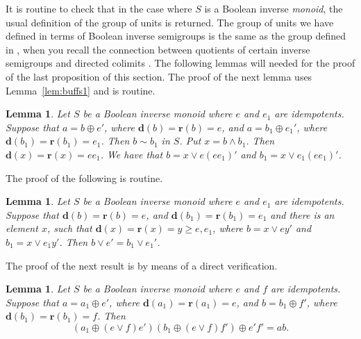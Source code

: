 \documentclass[a4paper]{amsart}
\newtheorem{lemma}[theorem]{Lemma}
\begin{document}
It is routine to check that in the case where $S$ is a Boolean inverse {\em monoid}, 
the usual definition of the group of units is returned.
The group of units we have defined in terms of Boolean inverse semigroups is the same
as the group defined in \cite[Remark 3.10]{NO}, 
when you recall the connection between quotients of certain inverse semigroups and directed colimits \cite[Section 2.5]{LS2}.
The following lemmas will needed for the proof of the last proposition of this section.
The proof of the next lemma uses Lemma~\ref{lem:buffs1} and is routine.

\begin{lemma}\label{lem:matt} Let $S$ be a Boolean inverse monoid where $e$ and $e_{1}$ are idempotents.
Suppose that
$a = b \oplus e'$, where $\mathbf{d}(b) = \mathbf{r}(b) = e$,
and 
$a = b_{1} \oplus e_{1}'$, where $\mathbf{d}(b_{1}) = \mathbf{r}(b_{1}) = e_{1}$.
Then $b \sim b_{1}$ in $S$.
Put $x = b \wedge b_{1}$.
Then $\mathbf{d}(x) = \mathbf{r}(x) = ee_{1}$.
We have that
$b = x \vee e(ee_{1})'$ and $b_{1} = x \vee e_{1}(ee_{1})'$.
\end{lemma}


The proof of the following is routine.


\begin{lemma}\label{lem:beard} Let $S$ be a Boolean inverse monoid where $e$ and $e_{1}$ are idempotents.
Suppose that
$\mathbf{d}(b) = \mathbf{r}(b) = e$,
and 
$\mathbf{d}(b_{1}) = \mathbf{r}(b_{1}) = e_{1}$
and there is an element $x$, 
such that $\mathbf{d}(x) = \mathbf{r}(x) = y \geq e,e_{1}$,
where $b = x \vee ey'$ and $b_{1} = x \vee e_{1}y'$.
Then $b \vee e' = b_{1} \vee e_{1}'$.
\end{lemma}


The proof of the next result is by means of a direct verification.


\begin{lemma}\label{lem:walsh} Let $S$ be a Boolean inverse monoid where $e$ and $f$ are idempotents.
Suppose that 
$a = a_{1} \oplus e'$, where $\mathbf{d}(a_{1}) = \mathbf{r}(a_{1}) = e$,
and 
$b = b_{1} \oplus f'$, where $\mathbf{d}(b_{1}) = \mathbf{r}(b_{1}) = f$.
Then
$$(a_{1} \oplus (e \vee f)e')(b_{1} \oplus (e \vee f)f') \oplus e'f' = ab.$$
\end{lemma}
\end{document}
